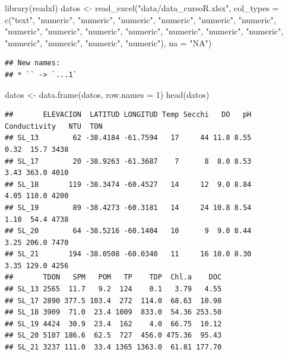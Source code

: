 \documentclass[
]{book}
\newenvironment{Shaded}{\begin{snugshade}}{\end{snugshade}}
\newcommand{\AttributeTok}[1]{\textcolor[rgb]{0.77,0.63,0.00}{#1}}
\newcommand{\DecValTok}[1]{\textcolor[rgb]{0.00,0.00,0.81}{#1}}
\newcommand{\FunctionTok}[1]{\textcolor[rgb]{0.00,0.00,0.00}{#1}}
\newcommand{\NormalTok}[1]{#1}
\newcommand{\OtherTok}[1]{\textcolor[rgb]{0.56,0.35,0.01}{#1}}
\newcommand{\StringTok}[1]{\textcolor[rgb]{0.31,0.60,0.02}{#1}}
\begin{document}
\begin{Shaded}
\begin{Highlighting}[]
\FunctionTok{library}\NormalTok{(readxl)}
\NormalTok{datos }\OtherTok{\textless{}{-}}  \FunctionTok{read\_excel}\NormalTok{(}\StringTok{"data/data\_cursoR.xlsx"}\NormalTok{, }
    \AttributeTok{col\_types =} \FunctionTok{c}\NormalTok{(}\StringTok{"text"}\NormalTok{, }\StringTok{"numeric"}\NormalTok{, }\StringTok{"numeric"}\NormalTok{, }
        \StringTok{"numeric"}\NormalTok{, }\StringTok{"numeric"}\NormalTok{, }\StringTok{"numeric"}\NormalTok{, }
        \StringTok{"numeric"}\NormalTok{, }\StringTok{"numeric"}\NormalTok{, }\StringTok{"numeric"}\NormalTok{, }
        \StringTok{"numeric"}\NormalTok{, }\StringTok{"numeric"}\NormalTok{, }\StringTok{"numeric"}\NormalTok{, }
        \StringTok{"numeric"}\NormalTok{, }\StringTok{"numeric"}\NormalTok{, }\StringTok{"numeric"}\NormalTok{, }
        \StringTok{"numeric"}\NormalTok{, }\StringTok{"numeric"}\NormalTok{, }\StringTok{"numeric"}\NormalTok{), }
    \AttributeTok{na =} \StringTok{"NA"}\NormalTok{)}
\end{Highlighting}
\end{Shaded}

\begin{verbatim}
## New names:
## * `` -> `...1`
\end{verbatim}

\begin{Shaded}
\begin{Highlighting}[]
\NormalTok{datos }\OtherTok{\textless{}{-}} \FunctionTok{data.frame}\NormalTok{(datos, }\AttributeTok{row.names =} \DecValTok{1}\NormalTok{)}
\FunctionTok{head}\NormalTok{(datos)}
\end{Highlighting}
\end{Shaded}

\begin{verbatim}
##       ELEVACION  LATITUD LONGITUD Temp Secchi   DO   pH Conductivity   NTU  TON
## SL_13        62 -38.4184 -61.7594   17     44 11.8 8.55         0.32  15.7 3438
## SL_17        20 -38.9263 -61.3687    7      8  8.0 8.53         3.43 363.0 4010
## SL_18       119 -38.3474 -60.4527   14     12  9.0 8.84         4.05 110.0 4200
## SL_19        89 -38.4273 -60.3181   14     24 10.8 8.54         1.10  54.4 4738
## SL_20        64 -38.5216 -60.1404   10      9  9.0 8.44         3.25 206.0 7470
## SL_21       194 -38.0508 -60.0340   11     16 10.0 8.30         3.35 129.0 4256
##       TDON   SPM   POM   TP    TDP  Chl.a    DOC
## SL_13 2565  11.7   9.2  124    0.1   3.79   4.55
## SL_17 2890 377.5 103.4  272  114.0  68.63  10.98
## SL_18 3909  71.0  23.4 1009  833.0  54.36 253.50
## SL_19 4424  30.9  23.4  162    4.0  66.75  10.12
## SL_20 5107 186.6  62.5  727  456.0 475.36  95.43
## SL_21 3237 111.0  33.4 1365 1363.0  61.81 177.70
\end{verbatim}
\end{document}
